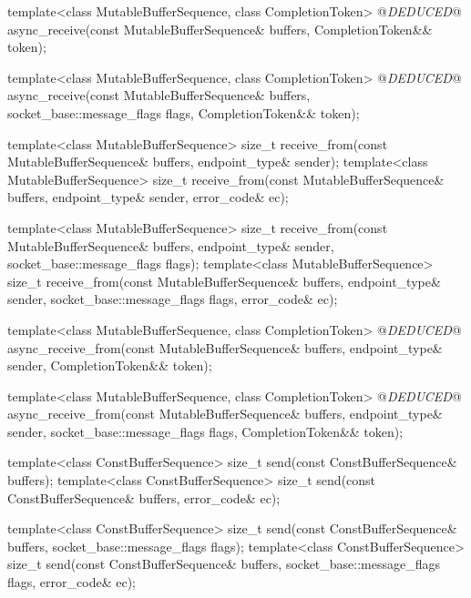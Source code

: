 \begin{codeblock}
{{{{{    template<class MutableBufferSequence, class CompletionToken>
      @\textit{DEDUCED}@ async_receive(const MutableBufferSequence& buffers,
                            CompletionToken&& token);

    template<class MutableBufferSequence, class CompletionToken>
      @\textit{DEDUCED}@ async_receive(const MutableBufferSequence& buffers,
                            socket_base::message_flags flags,
                            CompletionToken&& token);

    template<class MutableBufferSequence>
      size_t receive_from(const MutableBufferSequence& buffers,
                          endpoint_type& sender);
    template<class MutableBufferSequence>
      size_t receive_from(const MutableBufferSequence& buffers,
                          endpoint_type& sender, error_code& ec);

    template<class MutableBufferSequence>
      size_t receive_from(const MutableBufferSequence& buffers,
                          endpoint_type& sender,
                          socket_base::message_flags flags);
    template<class MutableBufferSequence>
      size_t receive_from(const MutableBufferSequence& buffers,
                          endpoint_type& sender,
                          socket_base::message_flags flags,
                          error_code& ec);

    template<class MutableBufferSequence, class CompletionToken>
      @\textit{DEDUCED}@ async_receive_from(const MutableBufferSequence& buffers,
                                 endpoint_type& sender,
                                 CompletionToken&& token);

    template<class MutableBufferSequence, class CompletionToken>
      @\textit{DEDUCED}@ async_receive_from(const MutableBufferSequence& buffers,
                                 endpoint_type& sender,
                                 socket_base::message_flags flags,
                                 CompletionToken&& token);

    template<class ConstBufferSequence>
      size_t send(const ConstBufferSequence& buffers);
    template<class ConstBufferSequence>
      size_t send(const ConstBufferSequence& buffers, error_code& ec);

    template<class ConstBufferSequence>
      size_t send(const ConstBufferSequence& buffers,
                  socket_base::message_flags flags);
    template<class ConstBufferSequence>
      size_t send(const ConstBufferSequence& buffers,
                  socket_base::message_flags flags, error_code& ec);

}}}}}
\end{codeblock}
